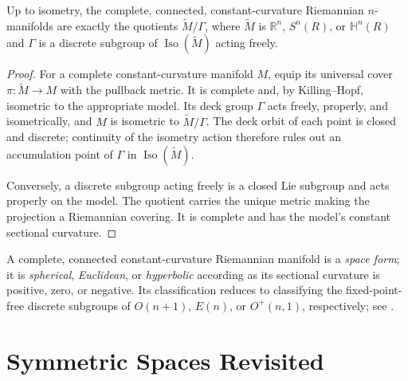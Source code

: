 \begin{corollary}
\label{cor:characterization-constant-curvature}
Up to isometry, the complete, connected, constant-curvature Riemannian
$n$-manifolds are exactly the quotients $\widetilde M/\Gamma$, where
$\widetilde M$ is $\mathbb R^n$, $S^n(R)$, or $\mathbb H^n(R)$ and $\Gamma$
is a discrete subgroup of $\operatorname{Iso}(\widetilde M)$ acting freely.
\begin{proof}
\sketch For a complete constant-curvature manifold $M$, equip its universal
cover $\pi:\widetilde M\to M$ with the pullback metric.  It is complete and,
by Killing--Hopf, isometric to the appropriate model.  Its deck group
$\Gamma$ acts freely, properly, and isometrically, and $M$ is isometric to
$\widetilde M/\Gamma$.  The deck orbit of each point is closed and discrete;
continuity of the isometry action therefore rules out an accumulation point
of $\Gamma$ in $\operatorname{Iso}(\widetilde M)$.

Conversely, a discrete subgroup acting freely is a closed Lie subgroup and
acts properly on the model.  The quotient carries the unique metric making
the projection a Riemannian covering.  It is complete and has the model's
constant sectional curvature.
\end{proof}
\end{corollary}

A complete, connected constant-curvature Riemannian manifold is a
\emph{space form}; it is \emph{spherical}, \emph{Euclidean}, or
\emph{hyperbolic} according as its sectional curvature is positive, zero, or
negative.  Its classification reduces to classifying the fixed-point-free
discrete subgroups of $O(n+1)$, $E(n)$, or $O^+(n,1)$, respectively; see
\cite{Wol11}.

\section{Symmetric Spaces Revisited}

